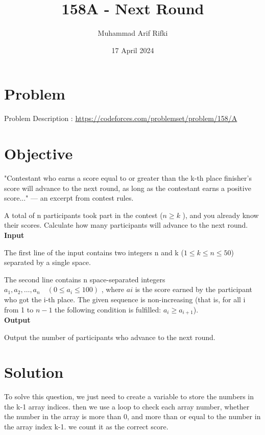 \documentclass{article}
\title{158A - Next Round}
\author{Muhammad Arif Rifki}
\date{17 April 2024}
\begin{document}
\maketitle


\section{Problem}

Problem Description : \href{https://codeforces.com/problemset/problem/158/A}{https://codeforces.com/problemset/problem/158/A}

\section{Objective}
"Contestant who earns a score equal to or greater than the k-th place finisher's score will advance to the next round, as long as the contestant earns a positive score..." — an excerpt from contest rules.

A total of n participants took part in the contest ($n \geq k$
), and you already know their scores. Calculate how many participants will advance to the next round.
\\\textbf{Input}

The first line of the input contains two integers n and k ($1 \leq k \leq n \leq 50$) separated by a single space.

The second line contains n space-separated integers $a_1, a_2, \ldots, a_n \quad (0 \leq a_i \leq 100)$
, where $ai$ is the score earned by the participant who got the i-th place. The given sequence is non-increasing (that is, for all i from 1 to $n-1$ the following condition is fulfilled: $a_i \geq a_{i+1}$).
\\\textbf{Output}

Output the number of participants who advance to the next round.
\section{Solution}

To solve this question, we just need to create a variable to store the numbers in the k-1 array indices. then we use a loop to check each array number, whether the number in the array is more than 0, and more than or equal to the number in the array index k-1. we count it as the correct score.
\end{document}
